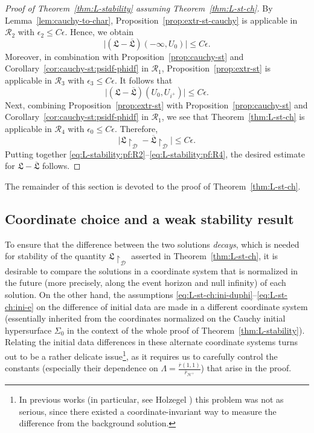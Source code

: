 \documentclass[10pt, reqno]{amsart}
\theoremstyle{definition}
\theoremstyle{remark}
\theoremstyle{conjecture}
\numberwithin{equation}{section}
\newcommand{\abs}[1]{\vert#1\vert}
\newcommand{\0}{\emptyset}
\newcommand{\eps}{\epsilon}
\newcommand{\Lmb}{\Lambda}
\newcommand{\Sgm}{\Sigma}
\newcommand{\calD}{\mathcal D}
\newcommand{\calH}{\mathcal H}
\newcommand{\calR}{\mathcal R}
\newcommand{\EH}{\calH^{+}}
\newcommand{\rbg}{\overline{r}}					%
\begin{document}
\begin{proof}[Proof of Theorem~\ref{thm:L-stability} assuming Theorem~\ref{thm:L-st-ch}]
By Lemma~\ref{lem:cauchy-to-char}, Proposition~\ref{prop:extr-st-cauchy} is applicable in $\calR_{2}$ with $\eps_{2} \leq C \eps$. Hence, we obtain
\begin{equation} \label{eq:L-stability:pf:R2}
 \abs{(\mathfrak{L} - \overline{\mathfrak{L}})(-\infty, U_{0})} \leq C \eps. 
\end{equation}
Moreover, in combination with Proposition~\ref{prop:cauchy-st} and Corollary~\ref{cor:cauchy-st:psidf-phidf} in $\calR_{1}$, Proposition~\ref{prop:extr-st} is applicable in $\calR_{3}$ with $\eps_{3} \leq C \eps$. It follows that
\begin{equation} \label{eq:L-stability:pf:R3}
 \abs{(\mathfrak{L} - \overline{\mathfrak{L}})(U_{0}, U_{i^{+}})} \leq C \eps. 
\end{equation}
Next, combining Proposition~\ref{prop:extr-st} with Proposition~\ref{prop:cauchy-st} and Corollary~\ref{cor:cauchy-st:psidf-phidf} in $\calR_{1}$, we see that Theorem~\ref{thm:L-st-ch} is applicable in $\calR_{4}$ with $\eps_{0} \leq C \eps$. Therefore,
\begin{equation} \label{eq:L-stability:pf:R4}
\abs{\mathfrak{L} \restriction_{\calD} - \overline{\mathfrak{L}} \restriction_{\calD} } \leq C \eps. 
\end{equation}
Putting together \eqref{eq:L-stability:pf:R2}--\eqref{eq:L-stability:pf:R4}, the desired estimate for $\mathfrak{L} - \overline{\mathfrak{L}}$ follows. \qedhere
\end{proof}

The remainder of this section is devoted to the proof of Theorem~\ref{thm:L-st-ch}. 

\subsection{Coordinate choice and a weak stability result} \label{subsec:weak-st}
To ensure that the difference between the two solutions \emph{decays}, which is needed for stability of the quantity $\mathfrak{L} \restriction_{\calD}$ asserted in Theorem~\ref{thm:L-st-ch}, it is desirable to compare the solutions in a coordinate system that is normalized in the future (more precisely, along the event horizon and null infinity) of each solution. On the other hand, the assumptions \eqref{eq:L-st-ch:ini-duphi}--\eqref{eq:L-st-ch:ini-e} on the difference of initial data are made in a different coordinate system (essentially inherited from the coordinates normalized on the Cauchy initial hypersurface $\Sgm_{0}$ in the context of the whole proof of Theorem~\ref{thm:L-stability}). Relating the initial data differences in these alternate coordinate systems turns out to be a rather delicate issue\footnote{In previous works (in particular, see Holzegel \cite{Hol.biaxial}) this problem was not as serious, since there existed a coordinate-invariant way to measure the difference from the background solution.}, as it requires us to carefully control the constants (especially their dependence on $\Lmb = \frac{\rbg(1,1)}{\rbg_{\EH}}$) that arise in the proof.
\end{document}

